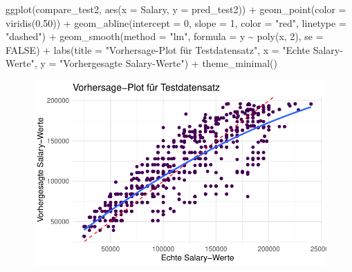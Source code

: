 \documentclass[
  letterpaper,
  DIV=11,
  numbers=noendperiod]{scrartcl}
\newenvironment{Shaded}{\begin{snugshade}}{\end{snugshade}}
\newcommand{\AttributeTok}[1]{\textcolor[rgb]{0.40,0.45,0.13}{#1}}
\newcommand{\ConstantTok}[1]{\textcolor[rgb]{0.56,0.35,0.01}{#1}}
\newcommand{\DecValTok}[1]{\textcolor[rgb]{0.68,0.00,0.00}{#1}}
\newcommand{\FloatTok}[1]{\textcolor[rgb]{0.68,0.00,0.00}{#1}}
\newcommand{\FunctionTok}[1]{\textcolor[rgb]{0.28,0.35,0.67}{#1}}
\newcommand{\NormalTok}[1]{\textcolor[rgb]{0.00,0.23,0.31}{#1}}
\newcommand{\SpecialCharTok}[1]{\textcolor[rgb]{0.37,0.37,0.37}{#1}}
\newcommand{\StringTok}[1]{\textcolor[rgb]{0.13,0.47,0.30}{#1}}
\begin{document}
\begin{Shaded}
\begin{Highlighting}[]
\FunctionTok{ggplot}\NormalTok{(compare\_test2, }\FunctionTok{aes}\NormalTok{(}\AttributeTok{x =}\NormalTok{ Salary, }\AttributeTok{y =}\NormalTok{ pred\_test2)) }\SpecialCharTok{+}
  \FunctionTok{geom\_point}\NormalTok{(}\AttributeTok{color =} \FunctionTok{viridis}\NormalTok{(}\FloatTok{0.50}\NormalTok{)) }\SpecialCharTok{+}
  \FunctionTok{geom\_abline}\NormalTok{(}\AttributeTok{intercept =} \DecValTok{0}\NormalTok{, }\AttributeTok{slope =} \DecValTok{1}\NormalTok{, }\AttributeTok{color =} \StringTok{"red"}\NormalTok{, }\AttributeTok{linetype =} \StringTok{"dashed"}\NormalTok{) }\SpecialCharTok{+}
  \FunctionTok{geom\_smooth}\NormalTok{(}\AttributeTok{method =} \StringTok{"lm"}\NormalTok{, }\AttributeTok{formula =}\NormalTok{ y }\SpecialCharTok{\textasciitilde{}} \FunctionTok{poly}\NormalTok{(x, }\DecValTok{2}\NormalTok{), }\AttributeTok{se =} \ConstantTok{FALSE}\NormalTok{) }\SpecialCharTok{+}
  \FunctionTok{labs}\NormalTok{(}\AttributeTok{title =} \StringTok{"Vorhersage{-}Plot für Testdatensatz"}\NormalTok{,}
       \AttributeTok{x =} \StringTok{"Echte Salary{-}Werte"}\NormalTok{,}
       \AttributeTok{y =} \StringTok{"Vorhergesagte Salary{-}Werte"}\NormalTok{) }\SpecialCharTok{+}
  \FunctionTok{theme\_minimal}\NormalTok{()}
\end{Highlighting}
\end{Shaded}

\begin{figure}[H]

{\centering \includegraphics{main_doc_files/figure-pdf/unnamed-chunk-146-2.pdf}

}

\end{figure}
\end{document}
